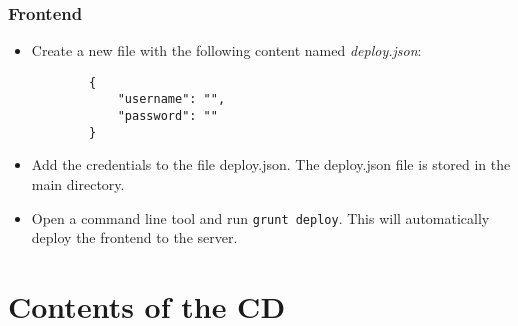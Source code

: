 \subsection{Frontend}

\begin{itemize}

    \item Create a new file with the following content named \textit{deploy.json}:
    \begin{lstlisting}
        {
            "username": "",
            "password": "" 
        }   
    \end{lstlisting}
    \item Add the credentials to the file deploy.json. The deploy.json file is stored in the main directory.
    \item Open a command line tool and run \texttt{grunt deploy}. This will automatically deploy the frontend to the server. 

\end{itemize}

\chapter{Contents of the CD}
